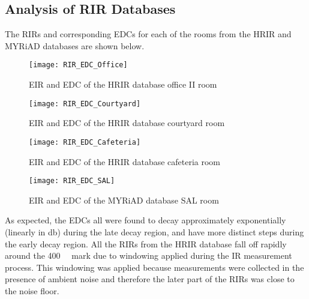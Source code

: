 


\subsection{Analysis of RIR Databases} \label{section:rir_databases}

The RIRs and corresponding EDCs for each of the rooms from the HRIR and MYRiAD databases are shown below.


\begin{figure}[H]
	\texttt{[image: RIR\_EDC\_Office]}
	\centering
	\caption{EIR and EDC of the HRIR database office II room}
	\label{fig:RIR_EDC_Office}
\end{figure}




\begin{figure}[H]
	\texttt{[image: RIR\_EDC\_Courtyard]}
	\centering
	\caption{EIR and EDC of the HRIR database courtyard room}
	\label{fig:RIR_EDC_Courtyard}
\end{figure}



\begin{figure}[H]
	\texttt{[image: RIR\_EDC\_Cafeteria]}
	\centering
	\caption{EIR and EDC of the HRIR database cafeteria room}
	\label{fig:RIR_EDC_Cafeteria}
\end{figure}



\begin{figure}[H]
	\texttt{[image: RIR\_EDC\_SAL]}
	\centering
	\caption{EIR and EDC of the MYRiAD database SAL room}
	\label{fig:RIR_EDC_SAL}
\end{figure}


As expected, the EDCs all were found to decay approximately exponentially (linearly in \unit{\decibel}) during the late decay region, and have more distinct steps during the early decay region. All the RIRs from the HRIR database fall off rapidly around the \qty{400}{\milli\sec} mark due to windowing applied during the IR measurement process. This windowing was applied because measurements were collected in the presence of ambient noise and therefore the later part of the RIRs was close to the noise floor.

